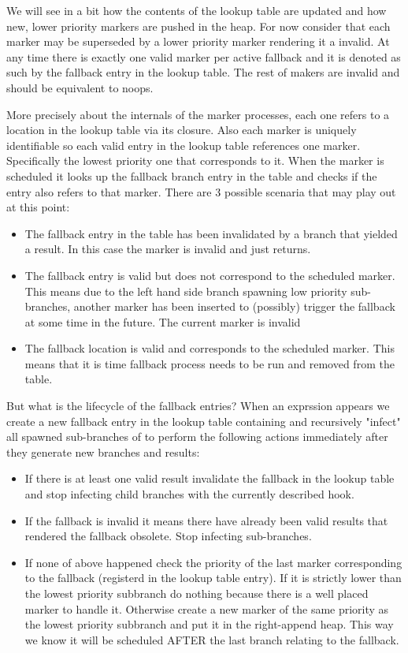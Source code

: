 We will see in a bit how the contents of the lookup table are updated
and how new, lower priority markers are pushed in the heap. For now
consider that each marker may be superseded by a lower priority marker
rendering it a invalid. At any time there is exactly one valid marker
per active fallback and it is denoted as such by the fallback entry in
the lookup table. The rest of makers are invalid and should be
equivalent to noops.

More precisely about the internals of the marker processes, each one
refers to a location in the lookup table via its closure. Also each
marker is uniquely identifiable so each valid entry in the lookup
table references one marker. Specifically the lowest priority one that
corresponds to it. When the marker is scheduled it looks up the
fallback branch entry in the table and checks if the entry also refers
to that marker. There are 3 possible scenaria that may play out at
this point:

\begin{itemize}
\item The fallback entry in the table has been invalidated by a branch
  that yielded a result. In this case the marker is invalid and just
  returns.
\item The fallback entry is valid but does not correspond to the
  scheduled marker. This means due to the left hand side branch
  spawning low priority sub-branches, another marker has been inserted
  to (possibly) trigger the fallback at some time in the future. The
  current marker is invalid
\item The fallback location is valid and corresponds to the scheduled
  marker. This means that it is time fallback process needs to be run
  and removed from the table.
\end{itemize}

But what is the lifecycle of the fallback entries? When an exprssion
 appears we create a new fallback entry in the lookup
table containing  and recursively "infect" all spawned
sub-branches of  to perform the following actions immediately
after they generate new branches and results:

\begin{itemize}
\item If there is at least one valid result invalidate the fallback in
  the lookup table and stop infecting child branches with the
  currently described hook.
\item If the fallback is invalid it means there have already been
  valid results that rendered the fallback obsolete. Stop infecting
  sub-branches.
\item If none of above happened check the priority of the last marker
  corresponding to the fallback (registerd in the lookup table
  entry). If it is strictly lower than the lowest priority subbranch
  do nothing because there is a well placed marker to handle
  it. Otherwise create a new marker of the same priority as the lowest
  priority subbranch and put it in the right-append heap. This way we
  know it will be scheduled AFTER the last branch relating to the
  fallback.
\end{itemize}


